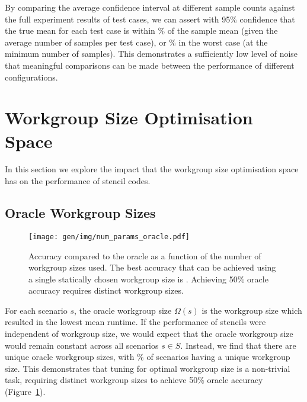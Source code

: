 By comparing the average confidence interval at different sample
counts against the full experiment results of
 test cases, we can assert with 95\%
confidence that the true mean for each test case is within
\% of the sample mean (given the average number of
samples per test case), or \% in the worst case (at
the minimum number of samples). This demonstrates a sufficiently low
level of noise that meaningful comparisons can be made between the
performance of different configurations. 


\section{Workgroup Size Optimisation Space}

In this section we explore the impact that the workgroup size
optimisation space has on the performance of stencil codes.

\subsection{Oracle Workgroup Sizes}

\begin{figure}
\centering
\texttt{[image: gen/img/num\_params\_oracle.pdf]}
\caption{%
  Accuracy compared to the oracle as a function of the number of
  workgroup sizes used. The best accuracy that can be achieved using a
  single statically chosen workgroup size is
  \protect. Achieving 50\%
  oracle accuracy requires \protect
  distinct workgroup sizes.%
}
\label{fig:oracle-accuracy}
\end{figure}

For each scenario $s$, the oracle workgroup size $\Omega(s)$ is the
workgroup size which resulted in the lowest mean runtime. If the
performance of stencils were independent of workgroup size, we would
expect that the oracle workgroup size would remain constant across all
scenarios $s \in S$. Instead, we find that there are
 unique oracle workgroup sizes, with
\% of scenarios having a
unique workgroup size. This demonstrates that tuning for optimal
workgroup size is a non-trivial task, requiring
 distinct workgroup sizes to
achieve 50\% oracle accuracy (Figure~\ref{fig:oracle-accuracy}).

